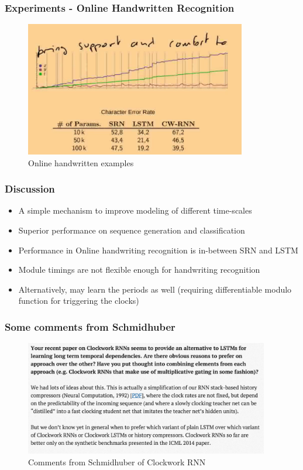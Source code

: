 \documentclass{beamer}
\begin{document}
\frame
{
   \frametitle{Experiments - Online Handwritten Recognition}
   \begin{figure}[ht]  
			\begin{center}
				\includegraphics[width=3.8in]{Images/cwrnn_handwritten.png}   
			\end{center}   
			\caption{\centering Online handwritten examples}
	\end{figure}
}
\frame
{
   \frametitle{Discussion}
   \begin{itemize}
   	\item A simple mechanism to improve modeling of different time-scales
   	\item Superior performance on sequence generation and classification
   	\item Performance in Online handwriting recognition is in-between SRN and LSTM
   	\item Module timings are not flexible enough for handwriting recognition
   	\item Alternatively, may learn the periods as well (requiring differentiable modulo function for triggering the clocks)
   \end{itemize}
}
\frame
{
   \frametitle{Some comments from Schmidhuber}
   \begin{figure}[ht]  
		\begin{center}
			\includegraphics[width=4.2in]{Images/comment_cwrnn.png}   
		\end{center}   
		\caption{Comments from Schmidhuber of Clockwork RNN}
	\end{figure}
}
\end{document}
